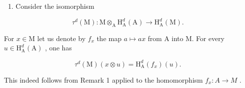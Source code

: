 \begin{enumerate}
\def\labelenumi{\arabic{enumi})}
\setcounter{enumi}{2}
\tightlist
\item
  Consider the isomorphism
\end{enumerate}

\[
\tau^ {d} (\mathrm{M}): \mathrm{M} \otimes_ {\mathrm{A}} \mathrm{H} _ {\mathrm{A}} ^ {d} (\mathrm{A}) \longrightarrow \mathrm{H} _ {\mathrm{A}} ^ {d} (\mathrm{M}).
\]

For \(x \in \mathrm{M}\) let us denote by \(f_x\) the map \(a \mapsto ax\) from A into M. For every \(u \in \mathrm{H}_{\mathrm{A}}^{d}(\mathrm{A})\) , one has

\[
\tau^ {d} (\mathrm{M}) (x \otimes u) = \mathrm{H} _ {\mathrm{A}} ^ {d} (f _ {x}) (u).
\]

This indeed follows from Remark 1 applied to the homomorphism \(f_{x}:A\to M\) .

